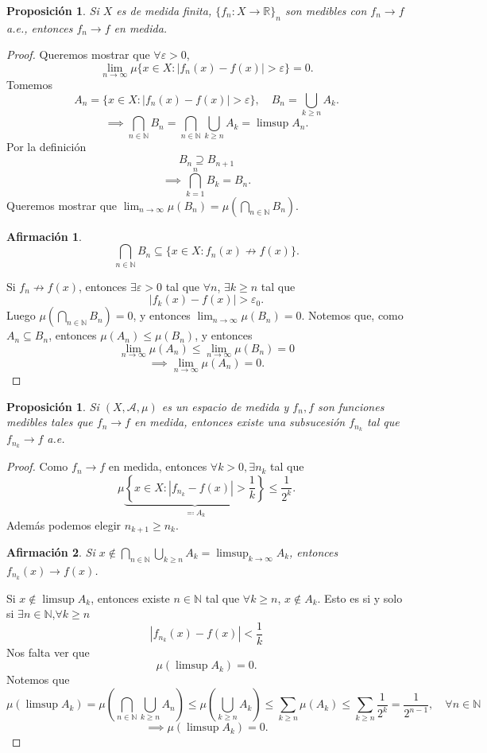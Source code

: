 \documentclass{article}
\newtheorem{claim}{Afirmación}
\newtheorem{proposition}[theorem]{Proposición}
\theoremstyle{definition}
\theoremstyle{remark}
\numberwithin{equation}{section}
\newcommand{\N}{\mathbb{N}}
\newcommand{\R}{\mathbb{R}}
\newcommand{\Acal}{\mathcal{A}}
\newcommand{\e}{\varepsilon}
\newcommand{\oo}{\infty}
\newcommand{\abs}[1]{\left| #1 \right|}
\newcommand{\br}[1]{\left( #1 \right)}
\newcommand{\set}[1]{\left\{ #1 \right\}}
\begin{document}
\begin{proposition}
  Si $X$ es de medida finita, $\{f_n \colon X \to \R\}_n$ son medibles con $f_n \to f$ a.e., entonces $f_n \to f$ en medida.
\end{proposition}
\begin{proof}
  Queremos mostrar que $\forall \e>0$, 
  \[ \lim_{n\to\oo} \mu\{x \in X \colon \abs{f_n(x) - f(x)} > \e\} = 0. \]
  Tomemos 
  \[ A_n = \{x \in X \colon \abs{f_n(x) - f(x)} > \e\}, \quad B_n = \bigcup_{k \geq n} A_k. \]
  \[\implies \bigcap_{n\in\N} B_n = \bigcap_{n \in \N} \bigcup_{k \geq n} A_k = \limsup A_n.\]
  Por la definición 
  \[ B_n \supseteq B_{n+1} \]
  \[\implies \bigcap_{k=1}^n B_k = B_n.\]
  Queremos mostrar que $\lim_{n\to\oo} \mu(B_n) = \mu\br{\bigcap_{n\in\N} B_n}$.
  \begin{claim}
    \[ \bigcap_{n\in\N} B_n \subseteq \{x \in X \colon f_n(x) \not\to f(x)\}. \]
  \end{claim}
  Si $f_n \not\to f(x)$, entonces $\exists \e>0$ tal que $\forall n$, $\exists k \geq n$ tal que 
  \[ \abs{f_k(x) - f(x)} > \e_0. \]
  Luego $\mu\br{\bigcap_{n\in\N} B_n} = 0$, y entonces $\lim_{n\to\oo} \mu(B_n) = 0$. Notemos que, como $A_n \subseteq B_n$, entonces $\mu(A_n) \leq \mu(B_n)$, y entonces 
  \[ \lim_{n\to\oo} \mu(A_n) \leq \lim_{n\to\oo} \mu(B_n) = 0 \]
  \[ \implies \lim_{n\to\oo} \mu(A_n) = 0. \]
\end{proof}

\begin{proposition}
  Si $(X,\Acal,\mu)$ es un espacio de medida y $f_n,f$ son funciones medibles tales que $f_n \to f$ en medida, entonces existe una subsucesión $f_{n_k}$ tal que $f_{n_k} \to f$ a.e.
\end{proposition}
\begin{proof}
  Como $f_n \to f$ en medida, entonces $\forall k > 0, \exists n_k$ tal que 
  \[ \mu\underbrace{\set{x \in X \colon \abs{f_{n_k} - f(x)} > \frac{1}{k}}}_{\eqcolon A_k} \leq \frac{1}{2^k}. \]
  Además podemos elegir $n_{k+1} \geq n_k$.
  \begin{claim}
    Si $x \notin \bigcap_{n\in\N} \bigcup_{k \geq n} A_k = \limsup_{k\to\oo} A_k$, entonces $f_{n_k}(x) \to f(x)$.
  \end{claim}
  Si $x \notin \limsup A_k$, entonces existe $n \in \N$ tal que $\forall k \geq n$, $x \notin A_k$. Esto es si y solo si $\exists n \in \N$,$ \forall k\geq n$ 
  \[ \abs{f_{n_k}(x) - f(x)} < \frac{1}{k} \]
  Nos falta ver que 
  \[ \mu(\limsup A_k) = 0. \]
  Notemos que 
  \[ \mu(\limsup A_k) = \mu\br{\bigcap_{n \in \N} \bigcup_{k \geq n} A_n} \leq \mu\br{\bigcup_{k \geq n} A_k} \leq \sum_{k \geq n} \mu(A_k) \leq \sum_{k \geq n} \frac{1}{2^k} = \frac{1}{2^{n-1}}, \quad \forall n \in \N \]
  \[ \implies \mu(\limsup A_k) = 0. \]
\end{proof}
\end{document}
